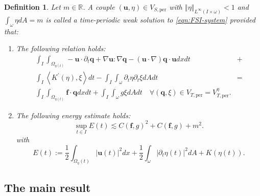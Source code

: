 \documentclass[10pt,a4paper]{article}
\newtheorem{definition}[theorem]{Definition}
\numberwithin{equation}{section}
\begin{document}
\begin{definition}\label{def:weak-periodic-solution}
Let $m\in \mathbb{R}$.
A couple $(\mathbf{u},\eta) \in V_{S, \text{per}}$ with $\left\Vert \eta\right\Vert _{L^{\infty}\left(I\times\omega\right)}<1$ and $\int_{\omega}\eta dA=m$
is called a \emph{time-periodic weak solution} to \eqref{eqn:FSI-system} provided that:
\begin{enumerate}
    \item The following relation holds:
\begin{equation}\label{eq: weak-periodic-solution}
\begin{aligned}\int_{I}\int_{\Omega_{\eta\left(t\right)}}-\mathbf{u}\cdot\partial_{t}\mathbf{q}+\nabla\mathbf{u}:\nabla\mathbf{q}-\left(\mathbf{u}\cdot\nabla\right)\mathbf{q}\cdot\mathbf{u}dxdt & +\\
\int_{I}\left\langle K^{\prime}\left(\eta\right),\xi\right\rangle dt -\int_{I}\int_{\omega}\partial_{t}\eta\partial_{t}\xi dAdt & =\\
\int_{I}\int_{\Omega_{\eta\left(t\right)}}\mathbf{f}\cdot\mathbf{q}dxdt+\int_{I}\int_{\omega}g\xi dAdt\quad\forall\left(\mathbf{q},\xi\right)\in V_{T,\text{per}}=V_{T,\text{per}}^{\eta}.
\end{aligned}
\end{equation}

\item The following energy estimate holds:
 \begin{equation}\label{eqn:energy-estimate}
\sup_{t\in I}E\left(t\right)\lesssim C\left(\mathbf{f},g\right)^{2}+C\left(\mathbf{f},g\right)+m^{2}.
\end{equation}
with
\begin{equation}
E\left(t\right):=\frac{1}{2}\int_{\Omega_{\eta}\left(t\right)}\left|\mathbf{u}\left(t\right)\right|^{2}dx+\frac{1}{2}\int_{\omega}\left|\partial_{t}\eta\left(t\right)\right|^{2}dA+K\left(\eta\left(t\right)\right).
\end{equation}

\end{enumerate}
\end{definition}

\subsection{The main result}\label{ssec:main-result}
\end{document}

